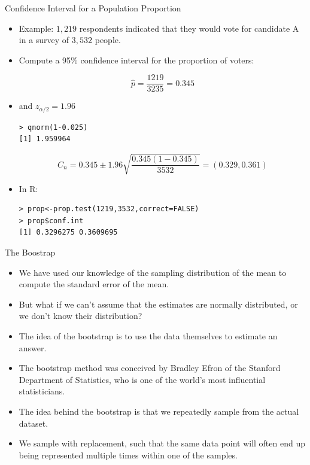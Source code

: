 \documentclass[handout]{beamer}
\begin{document}
\begin{frame}[fragile]{Confidence Interval for a Population Proportion}
\scriptsize{
\begin{itemize}
\item Example: $1,219$ respondents indicated that they would vote for candidate A in a survey of $3,532$ people. 

\item Compute a 95\% confidence interval for the proportion of voters: 
 
\begin{displaymath}
 \hat{p}=\frac{1219}{3235}=0.345
\end{displaymath}

\item and $z_{\alpha/2}=1.96$ 
\begin{verbatim}
> qnorm(1-0.025)
[1] 1.959964
\end{verbatim}

\begin{displaymath}
 C_n = 0.345 \pm 1.96\sqrt{\frac{0.345(1-0.345)}{3532}} = (0.329,0.361)  
 \end{displaymath} 
 
\item In R:
 
\begin{verbatim}
> prop<-prop.test(1219,3532,correct=FALSE)
> prop$conf.int
[1] 0.3296275 0.3609695
\end{verbatim}



\end{itemize}

}

 
\end{frame}



\begin{frame}{The Boostrap}
\scriptsize{

\begin{itemize}
 \item We have used our knowledge of the sampling distribution of the mean to compute the standard error of the mean. 
 \item But what if we can't assume that the estimates are normally distributed, or we don’t know their distribution? 
 \item The idea of the bootstrap is to use the data themselves to estimate an answer. 
 \item The bootstrap method was conceived by Bradley Efron of the Stanford Department of Statistics, who is one of the world's most influential statisticians.
\item The idea behind the bootstrap is that we repeatedly sample from the actual dataset.

\item We sample with replacement, such that the same data point will often end up being represented multiple times within one of the samples. 

\end{itemize}
}
 
\end{frame}
\end{document}
